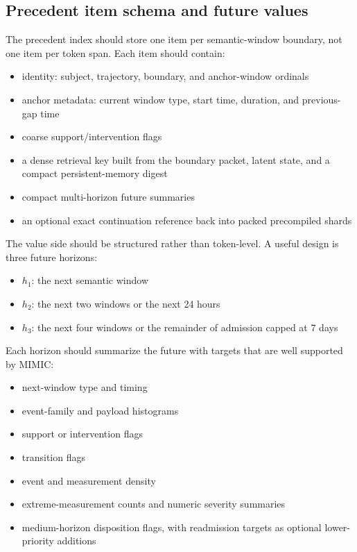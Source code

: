 \documentclass[11pt]{article}
\begin{document}
\subsection{Precedent item schema and future values}

The precedent index should store one item per semantic-window boundary, not one
item per token span. Each item should contain:
\begin{itemize}
    \item identity: subject, trajectory, boundary, and anchor-window ordinals
    \item anchor metadata: current window type, start time, duration, and previous-gap time
    \item coarse support/intervention flags
    \item a dense retrieval key built from the boundary packet, latent state, and a compact persistent-memory digest
    \item compact multi-horizon future summaries
    \item an optional exact continuation reference back into packed precompiled shards
\end{itemize}

The value side should be structured rather than token-level. A useful design is
three future horizons:
\begin{itemize}
    \item $h_1$: the next semantic window
    \item $h_2$: the next two windows or the next 24 hours
    \item $h_3$: the next four windows or the remainder of admission capped at 7 days
\end{itemize}

Each horizon should summarize the future with targets that are well supported
by MIMIC:
\begin{itemize}
    \item next-window type and timing
    \item event-family and payload histograms
    \item support or intervention flags
    \item transition flags
    \item event and measurement density
    \item extreme-measurement counts and numeric severity summaries
    \item medium-horizon disposition flags, with readmission targets as optional lower-priority additions
\end{itemize}
\end{document}
